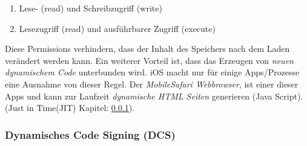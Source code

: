 \begin{enumerate}
    \item Lese- (read) und Schreibzugriff (write)
    \item Lesezugriff (read) und ausführbarer Zugriff (execute)
\end{enumerate}
Diese Permissions verhindern, dass der Inhalt des Speichers nach dem Laden verändert werden kann. Ein weiterer Vorteil ist, dass das Erzeugen von \textit{\glqq neuen dynamischem Code\grqq{}} unterbunden wird. iOS macht  nur für einige Apps/Prozesse eine Ausnahme von dieser Regel. Der \textit{\glqq MobileSafari Webbrowser\grqq}, ist einer dieser Apps und kann zur Laufzeit \textit{\glqq dynamische HTML Seiten\grqq{}} generieren (Java Script). (Just in Time(JIT) Kapitel: \ref{sec:Jit}).



\subsubsection{Dynamisches Code Signing (DCS)}
\label{sec:Jit}


